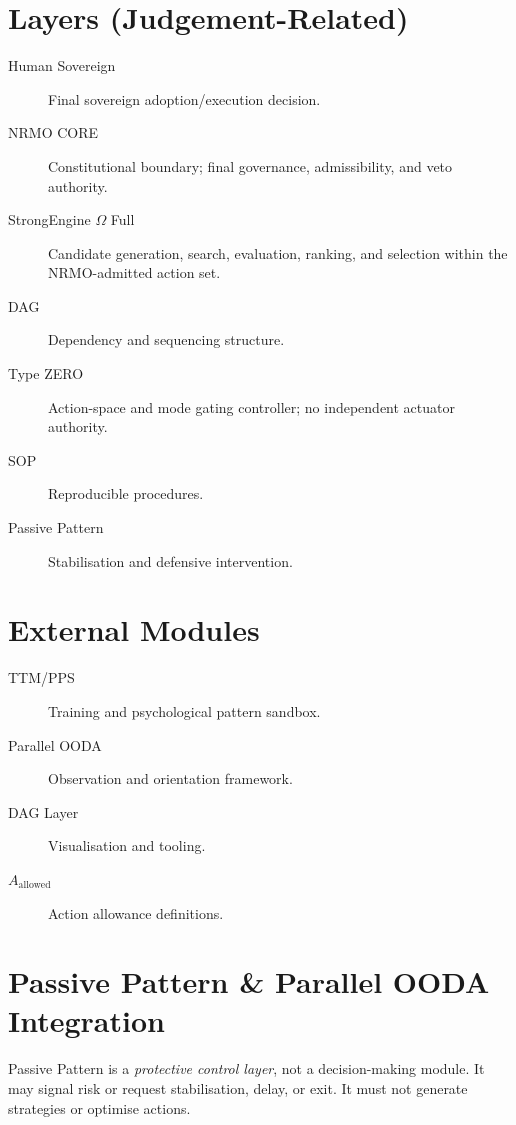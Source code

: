 \section{Layers (Judgement-Related)}
\label{sec:opspec-layers}

\begin{description}
\item[Human Sovereign] Final sovereign adoption/execution decision.
\item[NRMO CORE] Constitutional boundary; final governance,
admissibility, and veto authority.
\item[StrongEngine $\Omega$ Full] Candidate generation, search,
evaluation, ranking, and selection within the NRMO-admitted action set.
\item[DAG] Dependency and sequencing structure.
\item[Type ZERO] Action-space and mode gating controller; no independent
actuator authority.
\item[SOP] Reproducible procedures.
\item[Passive Pattern] Stabilisation and defensive intervention.
\end{description}

\section{External Modules}
\label{sec:opspec-external-modules}

\begin{description}
\item[TTM/PPS] Training and psychological pattern sandbox.
\item[Parallel OODA] Observation and orientation framework.
\item[DAG Layer] Visualisation and tooling.
\item[$A_{\mathrm{allowed}}$] Action allowance definitions.
\end{description}

\section{Passive Pattern \& Parallel OODA Integration}
\label{sec:opspec-pp-ooda-integration}

Passive Pattern is a \emph{protective control layer}, not a
decision-making module. It may signal risk or request stabilisation,
delay, or exit. It must not generate strategies or optimise actions.

